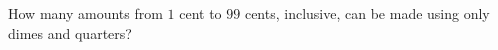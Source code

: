 How many amounts from $1$ cent to $99$ cents, inclusive, can be made using only dimes and quarters?

